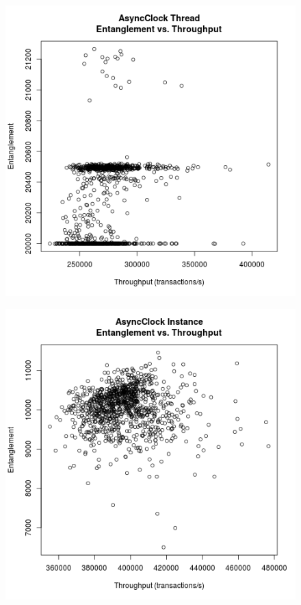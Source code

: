 \begin{figure}
\center
\includegraphics[height=.4\textheight]{async_thread_throughput_entanglement.png}
\caption{\label{async_thread_throughput_entanglement}}
\end{figure}

\begin{figure}
\center
\includegraphics[height=.4\textheight]{async_instance_throughput_entanglement.png}
\caption{\label{async_instance_throughput_entanglement}}
\end{figure}

